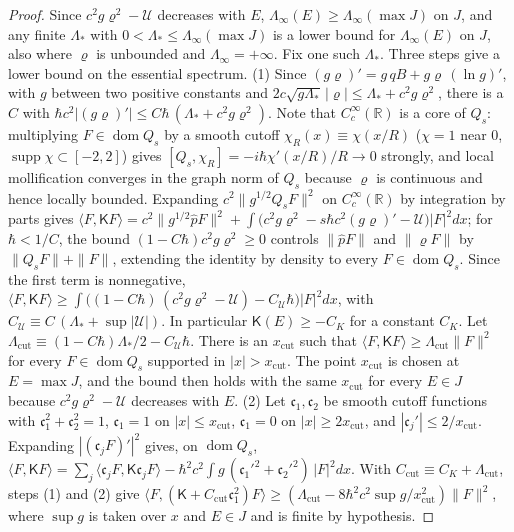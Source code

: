\documentclass[aps,prd,onecolumn,tightenlines,nofootinbib,notitlepage,11pt,floatfix]{revtex4-2}
\theoremstyle{indentedtheorem}
\begin{document}
\begin{proof}
Since $c^2g\varrho^2-\mathcal{U}$ decreases with $E$, $\Lambda_\infty(E)\geq\Lambda_\infty(\max J)$ on $J$, and any finite $\Lambda_*$ with $0<\Lambda_*\leq\Lambda_\infty(\max J)$ is a lower bound for $\Lambda_\infty(E)$ on $J$, also where $\varrho$ is unbounded and $\Lambda_\infty=+\infty$. Fix one such $\Lambda_*$. Three steps give a lower bound on the essential spectrum.
(1) Since $(g\varrho)'=g\,qB+g\varrho\,(\ln g)'$, with $g$ between two positive constants and $2c\sqrt{g\Lambda_*}\,|\varrho|\leq\Lambda_*+c^2g\varrho^2$, there is a $C$ with $\hbar c^2|(g\varrho)'|\leq C\hbar\,(\Lambda_*+c^2g\varrho^2)$. Note that $C_c^\infty(\mathbb{R})$ is a core of $Q_s$: multiplying $F\in\operatorname{dom}Q_s$ by a smooth cutoff $\chi_R(x)\equiv\chi(x/R)$ ($\chi=1$ near $0$, $\operatorname{supp}\chi\subset[-2,2]$) gives $[Q_s,\chi_R]=-i\hbar\chi'(x/R)/R\to 0$ strongly, and local mollification converges in the graph norm of $Q_s$ because $\varrho$ is continuous and hence locally bounded. Expanding $c^2\|g^{1/2}Q_s F\|^2$ on $C_c^\infty(\mathbb{R})$ by integration by parts gives $\langle F,\mathsf{K}F\rangle=c^2\|g^{1/2}\hat{p}F\|^2+\int\big(c^2g\varrho^2-s\hbar c^2(g\varrho)'-\mathcal{U}\big)|F|^2dx$; for $\hbar<1/C$, the bound $(1-C\hbar)c^2g\varrho^2\ge 0$ controls $\|\hat{p}F\|$ and $\|\varrho F\|$ by $\|Q_s F\|+\|F\|$, extending the identity by density to every $F\in\operatorname{dom}Q_s$. Since the first term is nonnegative, $\langle F,\mathsf{K}F\rangle\geq\int\big((1-C\hbar)\,(c^2g\varrho^2-\mathcal{U})-C_\mathcal{U}\hbar\big)|F|^2dx$, with $C_\mathcal{U}\equiv C\,(\Lambda_*+\sup|\mathcal{U}|)$. In particular $\mathsf{K}(E)\geq-C_K$ for a constant $C_K$. Let $\Lambda_\text{cut}\equiv(1-C\hbar)\Lambda_*/2-C_\mathcal{U}\hbar$. There is an $x_\text{cut}$ such that $\langle F,\mathsf{K}F\rangle\geq\Lambda_\text{cut}\|F\|^2$ for every $F\in\operatorname{dom}Q_s$ supported in $|x|>x_\text{cut}$. The point $x_\text{cut}$ is chosen at $E=\max J$, and the bound then holds with the same $x_\text{cut}$ for every $E\in J$ because $c^2g\varrho^2-\mathcal{U}$ decreases with $E$.
(2) Let $\mathfrak{c}_1,\mathfrak{c}_2$ be smooth cutoff functions with $\mathfrak{c}_1^2+\mathfrak{c}_2^2=1$, $\mathfrak{c}_1=1$ on $|x|\leq x_\text{cut}$, $\mathfrak{c}_1=0$ on $|x|\geq2x_\text{cut}$, and $|\mathfrak{c}_j'|\leq2/x_\text{cut}$. Expanding $|(\mathfrak{c}_jF)'|^2$ gives, on $\operatorname{dom}Q_s$, $\langle F,\mathsf{K}F\rangle=\sum_j\langle\mathfrak{c}_jF,\mathsf{K}\mathfrak{c}_jF\rangle-\hbar^2c^2\int g\,(\mathfrak{c}_1'^2+\mathfrak{c}_2'^2)\,|F|^2dx$. With $C_\text{cut}\equiv C_K+\Lambda_\text{cut}$, steps (1) and (2) give $\langle F,(\mathsf{K}+C_\text{cut}\mathfrak{c}_1^2)F\rangle\geq(\Lambda_\text{cut}-8\hbar^2c^2\sup g/x_\text{cut}^2)\|F\|^2$, where $\sup g$ is taken over $x$ and $E\in J$ and is finite by hypothesis.

\end{proof}
\end{document}
